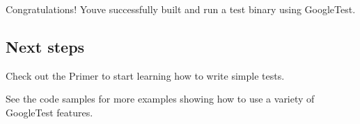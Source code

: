 Congratulations! You\textquotesingle{}ve successfully built and run a test binary using Google\+Test.

\subsection*{Next steps}


\begin{DoxyItemize}
\item Check out the Primer to start learning how to write simple tests.
\item See the code samples for more examples showing how to use a variety of Google\+Test features. 
\end{DoxyItemize}